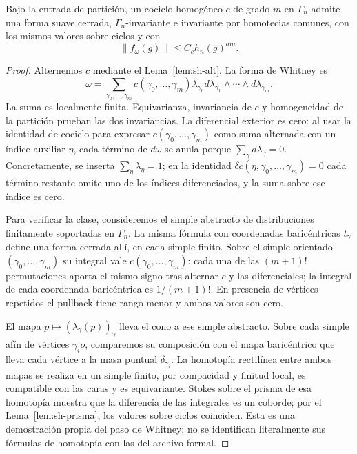 \begin{proposicion}
\label{prop:sh-whitney}
Bajo la entrada de partición, un cociclo homogéneo $c$ de grado $m$ en $\Gamma_n$ admite una forma suave cerrada, $\Gamma_n$-invariante e invariante por homotecias comunes, con los mismos valores sobre ciclos y con
\begin{equation}
 \|f_\omega(g)\|\le C_c h_n(g)^{am}.
 \label{eq:sh-whitney-cota}
\end{equation}
\end{proposicion}
\begin{proof}
Alternemos $c$ mediante el Lema~\ref{lem:sh-alt}. La forma de Whitney es
\begin{equation}
 \omega=\sum_{\gamma_0,\ldots,\gamma_m}
 c(\gamma_0,\ldots,\gamma_m)\lambda_{\gamma_0}
 d\lambda_{\gamma_1}\wedge\cdots\wedge d\lambda_{\gamma_m}.
 \label{eq:sh-whitney}
\end{equation}
La suma es localmente finita. Equivarianza, invariancia de $c$ y homogeneidad de la partición prueban las dos invariancias. La diferencial exterior es cero: al usar la identidad de cociclo para expresar $c(\gamma_0,\ldots,\gamma_m)$ como suma alternada con un índice auxiliar $\eta$, cada término de $d\omega$ se anula porque $\sum_\gamma d\lambda_\gamma=0$. Concretamente, se inserta $\sum_\eta\lambda_\eta=1$; en la identidad $\delta c(\eta,\gamma_0,\ldots,\gamma_m)=0$ cada término restante omite uno de los índices diferenciados, y la suma sobre ese índice es cero.

Para verificar la clase, consideremos el simple abstracto de distribuciones finitamente soportadas en $\Gamma_n$. La misma fórmula con coordenadas baricéntricas $t_\gamma$ define una forma cerrada allí, en cada simple finito. Sobre el simple orientado $(\gamma_0,\ldots,\gamma_m)$ su integral vale $c(\gamma_0,\ldots,\gamma_m)$: cada una de las $(m+1)!$ permutaciones aporta el mismo signo tras alternar $c$ y las diferenciales; la integral de cada coordenada baricéntrica es $1/(m+1)!$. En presencia de vértices repetidos el pullback tiene rango menor y ambos valores son cero.

El mapa $p\mapsto(\lambda_\gamma(p))_\gamma$ lleva el cono a ese simple abstracto. Sobre cada simple afín de vértices $\gamma_i o$, comparemos su composición con el mapa baricéntrico que lleva cada vértice a la masa puntual $\delta_{\gamma_i}$. La homotopía rectilínea entre ambos mapas se realiza en un simple finito, por compacidad y finitud local, es compatible con las caras y es equivariante. Stokes sobre el prisma de esa homotopía muestra que la diferencia de las integrales es un coborde; por el Lema~\ref{lem:sh-prisma}, los valores sobre ciclos coinciden. Esta es una demostración propia del paso de Whitney; no se identifican literalmente sus fórmulas de homotopía con las del archivo formal.


\end{proof}
